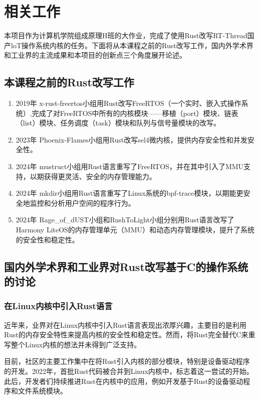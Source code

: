 \section{相关工作}

本项目作为计算机学院组成原理H班的大作业，完成了使用Rust改写RT-Thread国产loT操作系统内核的任务。下面将从本课程之前的Rust改写工作，国内外学术界和工业界的主流成果和本项目的创新点三个角度展开论述。

\subsection{本课程之前的Rust改写工作}

\begin{enumerate}
  \item 2019年 x-rust-freertos小组用Rust改写FreeRTOS（一个实时、嵌入式操作系统）,完成了对FreeRTOS中所有的内核模块——移植（port）模块、链表（list）模块、任务调度（task）模块和队列与信号量模块的改写。
  \item 2023年 Phoenix-Flames小组用Rust改写sel4微内核，提供内存安全性和并发安全性。
  \item 2024年 mustruct小组用Rust语言重写了FreeRTOS，并在其中引入了MMU支持，以期获得更灵活、安全的内存管理能力。
  \item 2024年 mkdir小组用Rust语言重写了Linux系统的bpf-trace模块，以期能更安全地监控和分析用户空间的程序行为。
  \item 2024年 Rage\_of\_dUST小组和RushToLight小组分别用Rust语言改写了Harmony LiteOS的内存管理单元（MMU）和动态内存管理模块，提升了系统的安全性和稳定性。
\end{enumerate}

\subsection{国内外学术界和工业界对Rust改写基于C的操作系统的讨论}

\subsubsection{在Linux内核中引入Rust语言}

近年来，业界对在Linux内核中引入Rust语言表现出浓厚兴趣，主要目的是利用Rust的内存安全特性来提高内核的安全性和稳定性。然而，将Rust完全替代C来重写整个Linux内核的想法并未得到广泛支持。

目前，社区的主要工作集中在将Rust引入内核的部分模块，特别是设备驱动程序的开发。2022年，首批Rust代码被合并到Linux内核中，标志着这一尝试的开始。此后，开发者们持续推进Rust在内核中的应用，例如开发基于Rust的设备驱动程序和文件系统模块。

